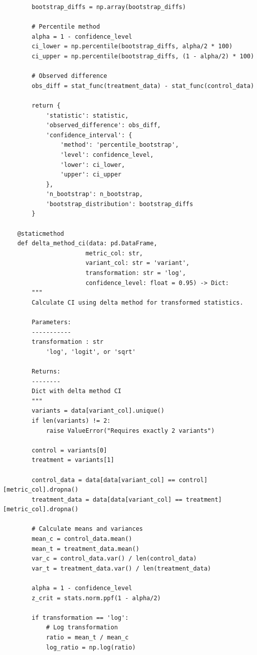 \begin{lstlisting}
        bootstrap_diffs = np.array(bootstrap_diffs)

        # Percentile method
        alpha = 1 - confidence_level
        ci_lower = np.percentile(bootstrap_diffs, alpha/2 * 100)
        ci_upper = np.percentile(bootstrap_diffs, (1 - alpha/2) * 100)

        # Observed difference
        obs_diff = stat_func(treatment_data) - stat_func(control_data)

        return {
            'statistic': statistic,
            'observed_difference': obs_diff,
            'confidence_interval': {
                'method': 'percentile_bootstrap',
                'level': confidence_level,
                'lower': ci_lower,
                'upper': ci_upper
            },
            'n_bootstrap': n_bootstrap,
            'bootstrap_distribution': bootstrap_diffs
        }

    @staticmethod
    def delta_method_ci(data: pd.DataFrame,
                       metric_col: str,
                       variant_col: str = 'variant',
                       transformation: str = 'log',
                       confidence_level: float = 0.95) -> Dict:
        """
        Calculate CI using delta method for transformed statistics.

        Parameters:
        -----------
        transformation : str
            'log', 'logit', or 'sqrt'

        Returns:
        --------
        Dict with delta method CI
        """
        variants = data[variant_col].unique()
        if len(variants) != 2:
            raise ValueError("Requires exactly 2 variants")

        control = variants[0]
        treatment = variants[1]

        control_data = data[data[variant_col] == control][metric_col].dropna()
        treatment_data = data[data[variant_col] == treatment][metric_col].dropna()

        # Calculate means and variances
        mean_c = control_data.mean()
        mean_t = treatment_data.mean()
        var_c = control_data.var() / len(control_data)
        var_t = treatment_data.var() / len(treatment_data)

        alpha = 1 - confidence_level
        z_crit = stats.norm.ppf(1 - alpha/2)

        if transformation == 'log':
            # Log transformation
            ratio = mean_t / mean_c
            log_ratio = np.log(ratio)


\end{lstlisting}

